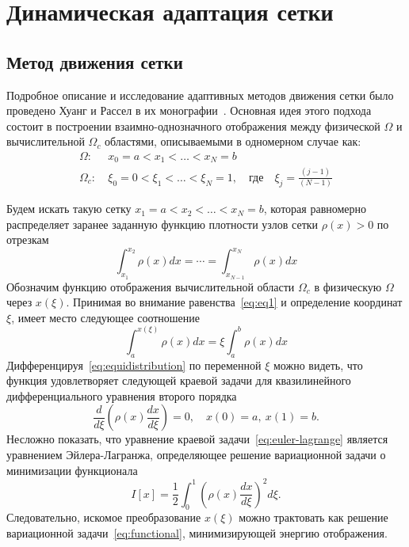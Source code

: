 \chapter{Динамическая адаптация сетки} \label{ch:ch2}

\section{Метод движения сетки}
Подробное описание и исследование адаптивных методов движения сетки было проведено Хуанг и Рассел в их монографии~\cite{huang_adaptive_2011}. Основная идея этого подхода состоит в построении взаимно-однозначного отображения между физической $\Omega$ и вычислительной $\Omega_c$  областями, описываемыми в одномерном случае как:
\begin{align}
\Omega:&\ x_0=a<x_1<\dots<x_N = b \\
\Omega_c:&\ \xi_0=0<\xi_1<\dots<\xi_N = 1,\quad \text{где}\quad \xi_j = \frac{(j-1)}{(N-1)}
\end{align}

Будем искать такую сетку $x_1 = a<x_2<\dots<x_N=b$, которая равномерно распределяет заранее заданную функцию плотности узлов сетки  $\rho(x) > 0$ по отрезкам
\begin{equation}
\int_{x_1}^{x_2}\rho(x)dx = \cdots = \int_{x_{N-1}}^{x_N}\rho(x)dx
\label{eq:eq1}
\end{equation}
Обозначим функцию отображения вычислительной области $\Omega_c$  в физическую $\Omega$ через $x(\xi)$. Принимая во внимание равенства~\eqref{eq:eq1} и определение координат $\xi$, имеет место следующее соотношение
\begin{equation}
\int_{a}^{x(\xi)}\rho(x)dx = \xi \int_{a}^{b}\rho(x)dx
\label{eq:equidistribution}
\end{equation}
Дифференцируя~\eqref{eq:equidistribution} по переменной $\xi$ можно видеть, что функция   удовлетворяет следующей краевой задачи для квазилинейного дифференциального уравнения второго порядка
\begin{equation}
\frac{d}{d\xi}\left(\rho(x)\frac{dx}{d\xi} \right) = 0, \quad x(0)=a, \ x(1) = b.	
\label{eq:euler-lagrange}
\end{equation}
Несложно показать, что уравнение краевой задачи~\eqref{eq:euler-lagrange} является уравнением Эйлера-Лагранжа, определяющее решение вариационной задачи о минимизации функционала 
\begin{equation}
I[x] = \frac{1}{2}\int_{0}^{1}\left(\rho(x)\frac{dx}{d\xi} \right)^2d\xi.
\label{eq:functional}
\end{equation}
Следовательно, искомое преобразование $x(\xi)$  можно трактовать как решение вариационной задачи~\eqref{eq:functional}, минимизирующей энергию отображения.

